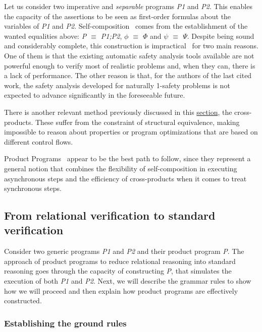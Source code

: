 Let us consider two imperative and \emph{separable} programs \emph{P1} and \emph{P2}.
This enables the capacity of the assertions to be seen as first-order formulas about the variables of \emph{P1} and \emph{P2}.
Self-composition~\cite{DBLP:conf/csfw/BartheDR04} comes from the establishment of the wanted equalities above: \emph{P $\equiv$ P1;P2}, \emph{$\phi$ $\equiv$ $\Phi$} and \emph{$\psi$ $\equiv$ $\Psi$}.
Despite being sound and considerably complete, this construction is impractical~\cite{DBLP:conf/sas/TerauchiA05} for two main reasons.
One of them is that the existing automatic safety analysis tools available are not powerful enough to verify most of realistic problems and, when they can, there is a lack of performance.
The other reason is that, for the authors of the last cited work, the safety analysis developed for naturally 1-safety problems is not expected to advance significantly in the foreseeable future.

There is another relevant method previously discussed in this \hyperref[sec:cross_products]{section}, the cross-products.
These suffer from the constraint of structural equivalence, making impossible to reason about properties or program optimizations that are based on different control flows.

Product Programs~\cite{DBLP:conf/fm/BartheCK11} appear to be the best path to follow, since they represent a general notion that combines the flexibility of self-composition in executing asynchronous steps and the efficiency of cross-products when it comes to treat synchronous steps. 


\subsection{From relational verification to standard verification} 
\label{subsec:product_programs_relverif_to_stdverif}

Consider two generic programs \emph{P1} and \emph{P2} and their product program \emph{P}.
The approach of product programs to reduce relational reasoning into standard reasoning goes through the capacity of constructing \emph{P}, that simulates the execution of both \emph{P1} and \emph{P2}.
Next, we will describe the grammar rules to show how we will proceed and then explain how product programs are effectively constructed.

\subsubsection{Establishing the ground rules} 
\label{subsubsec:product_programs_ground_rules}

